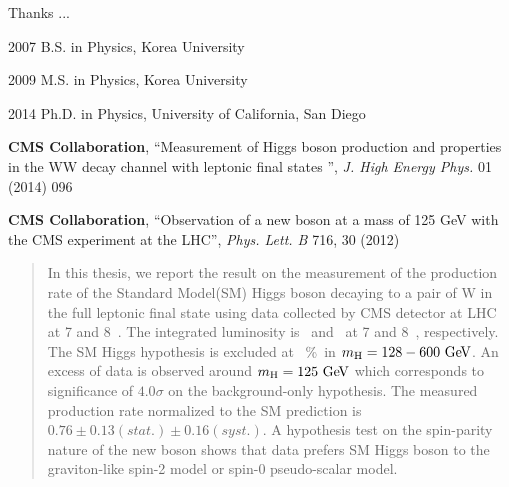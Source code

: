 \begin{frontmatter}
%
\tableofcontents
\listoffigures  %
\listoftables   %



%
%
\begin{acknowledgements} 
 Thanks ... 

\end{acknowledgements}


%
%
\begin{vitapage}
\begin{vita}
  \item[2007] B.S. in Physics, Korea University 
  \item[2009] M.S. in Physics, Korea University 
  \item[2014] Ph.D. in Physics, University of California, San Diego 
\end{vita}
\begin{publications}
  \item \textbf{CMS Collaboration}, {``Measurement of Higgs boson production and properties in the WW decay channel with leptonic final states ''}, \emph{J. High Energy Phys.} 01 (2014) 096
  \item \textbf{CMS Collaboration}, {``Observation of a new boson at a mass of 125 GeV with the CMS experiment at the LHC''}, \emph{Phys. Lett. B} 716, 30 (2012) 
\end{publications}
\end{vitapage}


%
%
\begin{abstract}
  In this thesis, we report the result on the measurement of the production rate 
  of the Standard Model(SM) Higgs boson decaying to a pair of W in the full leptonic final state
  using data collected by CMS detector at LHC at 7 and 8~\TeV. The integrated luminosity 
  is \intlumiSevenTeV\ and \intlumiEightTeV\ at 7 and 8~\TeV, respectively. 
  The SM Higgs hypothesis is excluded at ~\%\ in $m_{\mathrm{H}}=128-600~\mathrm{Ge\kern -0.1em V}$.   
  An excess of data is observed around $m_{\mathrm{H}}=125~\mathrm{Ge\kern -0.1em V}$ which corresponds to significance 
  of $4.0\sigma$ on the background-only hypothesis. The measured production rate normalized 
  to the SM prediction is $0.76 \pm 0.13(stat.) \pm 0.16(syst.)$. 
  A hypothesis test on the spin-parity nature of the new boson shows that data prefers 
  SM Higgs boson to the graviton-like spin-2 model or spin-0 pseudo-scalar model. 

\end{abstract}


\end{frontmatter}
